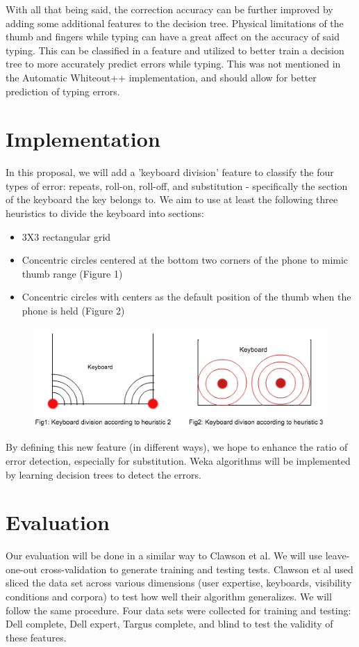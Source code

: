 \documentclass[letterpaper, 9 pt, conference]{ieeeconf}  %
\begin{document}
With all that being said, the correction accuracy can be further improved by adding some additional features to the decision tree.  Physical limitations of the thumb and fingers while typing can have a great affect on the accuracy of said typing.  This can be classified in a feature and utilized to better train a decision tree to more accurately predict errors while typing.  This was not mentioned in the Automatic Whiteout++ implementation, and should allow for better prediction of typing errors.

\section{Implementation}
In this proposal, we will add a 'keyboard division' feature to classify the four types of error: repeats, roll-on, roll-off, and substitution - specifically the section of the keyboard the key belongs to. We aim to use at least the following three heuristics to divide the keyboard into sections:
\begin{itemize}
\item 3X3 rectangular grid
\item Concentric circles centered at the bottom two corners of the phone to mimic thumb range (Figure 1)
\item Concentric circles with centers as the default position of the thumb when the phone is held (Figure 2)
\end{itemize}

\begin{figure}
	\centering
	\includegraphics[scale=0.5]{heuristics}
\end{figure}

By defining this new feature (in different ways), we hope to enhance the ratio of error detection, especially for substitution. Weka algorithms will be implemented by learning decision trees to detect the errors.

\section{Evaluation}
Our evaluation will be done in a similar way to Clawson et al. We will use leave-one-out cross-validation to generate training and testing tests. Clawson et al used sliced the data set across various dimensions (user expertise, keyboards, visibility conditions and corpora) to test how well their algorithm generalizes. We will follow the same procedure.  Four data sets were collected for training and testing: Dell complete, Dell expert, Targus complete, and blind to test the validity of these features.
\end{document}

